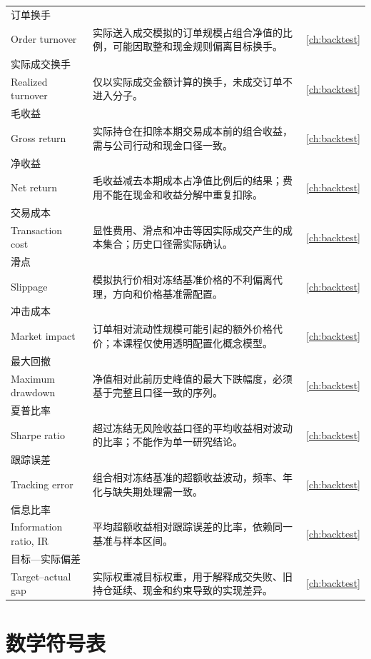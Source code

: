 \begin{longtable}{@{}p{3.2cm}p{9.0cm}p{2.8cm}@{}}
订单换手\\Order turnover & 实际送入成交模拟的订单规模占组合净值的比例，可能因取整和现金规则偏离目标换手。 & \cref{ch:backtest} \\
实际成交换手\\Realized turnover & 仅以实际成交金额计算的换手，未成交订单不进入分子。 & \cref{ch:backtest} \\
毛收益\\Gross return & 实际持仓在扣除本期交易成本前的组合收益，需与公司行动和现金口径一致。 & \cref{ch:backtest} \\
净收益\\Net return & 毛收益减去本期成本占净值比例后的结果；费用不能在现金和收益分解中重复扣除。 & \cref{ch:backtest} \\
交易成本\\Transaction cost & 显性费用、滑点和冲击等因实际成交产生的成本集合；历史口径需实际确认。 & \cref{ch:backtest} \\
滑点\\Slippage & 模拟执行价相对冻结基准价格的不利偏离代理，方向和价格基准需配置。 & \cref{ch:backtest} \\
冲击成本\\Market impact & 订单相对流动性规模可能引起的额外价格代价；本课程仅使用透明配置化概念模型。 & \cref{ch:backtest} \\
最大回撤\\Maximum drawdown & 净值相对此前历史峰值的最大下跌幅度，必须基于完整且口径一致的序列。 & \cref{ch:backtest} \\
夏普比率\\Sharpe ratio & 超过冻结无风险收益口径的平均收益相对波动的比率；不能作为单一研究结论。 & \cref{ch:backtest} \\
跟踪误差\\Tracking error & 组合相对冻结基准的超额收益波动，频率、年化与缺失期处理需一致。 & \cref{ch:backtest} \\
信息比率\\Information ratio, IR & 平均超额收益相对跟踪误差的比率，依赖同一基准与样本区间。 & \cref{ch:backtest} \\
目标—实际偏差\\Target--actual gap & 实际权重减目标权重，用于解释成交失败、旧持仓延续、现金和约束导致的实现差异。 & \cref{ch:backtest} \\
\bottomrule
\end{longtable}
\endgroup

\section{数学符号表}

